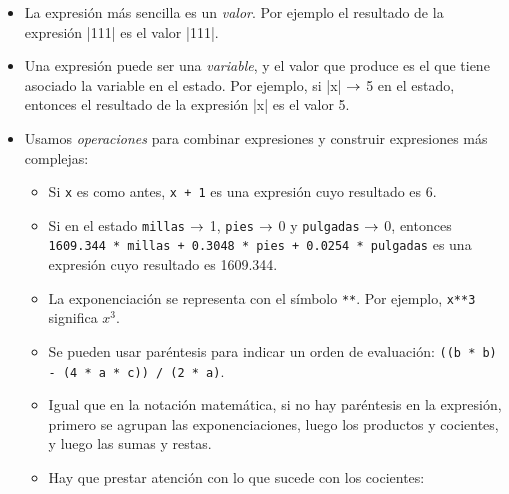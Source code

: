 \begin{itemize}
\item La expresión más sencilla es un {\it valor}.  Por ejemplo el
    resultado de la expresión |111| es el valor |111|.

\item Una expresión puede ser una {\it variable}, y el valor que produce es el
    que tiene asociado la variable en el estado. Por ejemplo, si |x| $\rightarrow$ 5 en
    el estado, entonces el resultado de la expresión |x|  es el valor 5.

\item Usamos {\it operaciones} para combinar expresiones y construir
expresiones más complejas:

\begin{itemize}
\item Si \lstinline!x! es como antes, \lstinline!x + 1! es una expresión cuyo
resultado es 6.

\item Si en el estado \lstinline!millas! $\rightarrow$ 1, \lstinline!pies! $\rightarrow$ 0 y
\lstinline!pulgadas! $\rightarrow$ 0, entonces
\lstinline[breaklines=true]!1609.344 * millas + 0.3048 * pies + 0.0254 * pulgadas! es una
expresión cuyo resultado es 1609.344.

\item La exponenciación se representa con el símbolo \lstinline!**!. Por
ejemplo, \lstinline!x**3! significa $x^3$.

\item Se pueden usar paréntesis para indicar un orden de
evaluación: \lstinline[breaklines=true]!((b * b) - (4 * a * c)) / (2 * a)!.

\item Igual que en la notación matemática, si no hay paréntesis en la
expresión, primero se agrupan las exponenciaciones, luego los
productos y cocientes, y luego las sumas y restas.

\item Hay que prestar atención con lo que sucede con los
cocientes:



\end{itemize}
\end{itemize}

